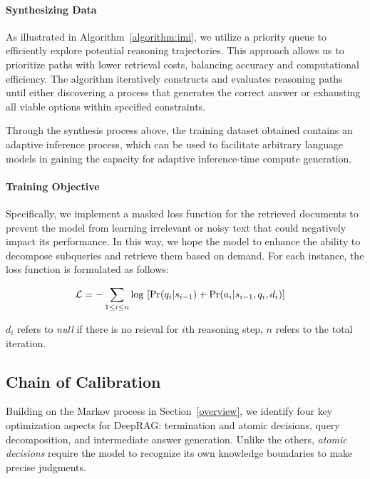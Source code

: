 

\paragraph{Synthesizing Data}  As illustrated in Algorithm~\ref{algorithm:imi}, we utilize a priority queue to efficiently explore potential reasoning trajectories. This approach allows us to prioritize paths with lower retrieval costs, balancing accuracy and computational efficiency. 
The algorithm iteratively constructs and evaluates reasoning paths until either discovering a process that generates the correct answer or exhausting all viable options within specified constraints.

Through the synthesis process above, the training dataset obtained contains an adaptive inference process, which can be used to facilitate arbitrary language models in gaining the capacity for adaptive inference-time compute generation.


\paragraph{Training Objective} Specifically, we implement a masked loss function for the retrieved documents to prevent the model from learning irrelevant or noisy text that could negatively impact its performance. In this way, we hope the model to enhance the ability to decompose subqueries and retrieve them based on demand. For each instance, the loss function is formulated as follows:

\begin{small}
    
\begin{align}
&\mathcal{L}= -\sum_{1\leq i\leq n}\text{log }[\text{Pr}(q_i| s_{i-1}) + \text{Pr}(a_i| s_{i-1}, q_i, d_i)] \notag
\end{align}
\end{small}
$d_i$ refers to \textit{null} if there is no reieval for $i$th reasoning step, $n$ refers to the total iteration.


\subsection{Chain of Calibration}
Building on the Markov process in Section~\ref{overview}, we identify four key optimization aspects for DeepRAG: termination and atomic decisions, query decomposition, and intermediate answer generation. Unlike the others, \textit{atomic decisions} require the model to recognize its own knowledge boundaries to make precise judgments.  

